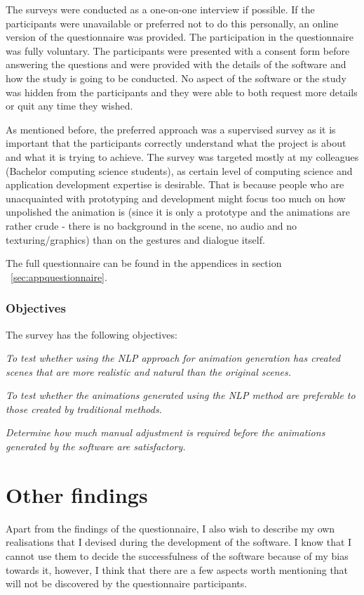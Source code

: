 The surveys were conducted as a one-on-one interview if possible. If the participants were unavailable or preferred not to do this personally, an online version of the questionnaire was provided. The participation in the questionnaire was fully voluntary. The participants were presented with a consent form before answering the questions and were provided with the details of the software and how the study is going to be conducted. No aspect of the software or the study was hidden from the participants and they were able to both request more details or quit any time they wished.

As mentioned before, the preferred approach was a supervised survey as it is important that the participants correctly understand what the project is about and what it is trying to achieve. The survey was targeted mostly at my colleagues (Bachelor computing science students), as certain level of computing science and application development expertise is desirable. That is because people who are unacquainted with prototyping and development might focus too much on how unpolished the animation is (since it is only a prototype and the animations are rather crude - there is no background in the scene, no audio and no texturing/graphics) than on the gestures and dialogue itself.

The full questionnaire can be found in the appendices in section ~\ref{sec:appquestionnaire}.

\medskip
\subsubsection{Objectives}
The survey has the following objectives:

\begin{addmargin}[2em]{2em}
	\noindent \textit{To test whether using the NLP approach for animation generation has created scenes that are more realistic and natural than the original scenes.}
	
	\medskip
	
	\noindent \textit{To test whether the animations generated using the NLP method are preferable to those created by traditional methods.}
	\medskip
	
	\noindent \textit{Determine how much manual adjustment is required before the animations generated by the software are satisfactory.}
\end{addmargin}



\section{Other findings \label{sec:evalotherfindings}}
Apart from the findings of the questionnaire, I also wish to describe my own realisations that I devised during the development of the software. I know that I cannot use them to decide the successfulness of the software because of my bias towards it, however, I think that there are a few aspects worth mentioning that will not be discovered by the questionnaire participants.

